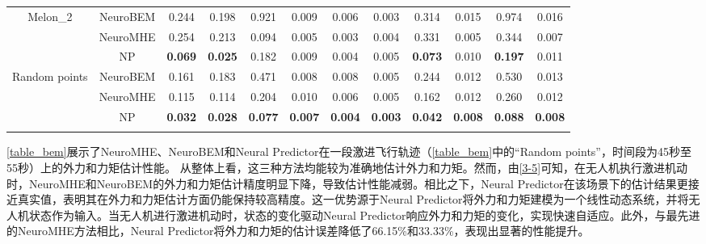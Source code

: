 \documentclass[lang=chs, degree=master, blindreview=false, winfonts=true]{yanputhesis}
\begin{document}
\begin{table}[h]
\begin{tabular}{c c c c c c c c c c c c}
	\hline
	\multirow{3}{*}{Melon\_2} & NeuroBEM & 0.244 & 0.198 & 0.921 & 0.009 & 0.006 & 0.003 & 0.314 & 0.015 & 0.974 & 0.016 \\
	& NeuroMHE & 0.254 & 0.213 & 0.094 & 0.005 & 0.003 & 0.004 & 0.331 & 0.005 & 0.344 & 0.007 \\
	& NP & \textbf{0.069} & \textbf{0.025} & 0.182 & 0.009 & 0.004 & 0.005 & \textbf{0.073} & 0.010 & \textbf{0.197} & 0.011 \\
	\hline
	\multirow{3}{*}{Random points} & NeuroBEM & 0.161 & 0.183 & 0.471 & 0.008 & 0.008 & 0.005 & 0.244 & 0.012 & 0.530 & 0.013 \\
	& NeuroMHE & 0.115 & 0.114 & 0.204 & 0.010 & 0.006 & 0.005 & 0.162 & 0.012 & 0.260 & 0.012 \\
	& NP & \textbf{0.032} & \textbf{0.028} & \textbf{0.077} & \textbf{0.007} & \textbf{0.004} & \textbf{0.003} & \textbf{0.042} & \textbf{0.008} & \textbf{0.088} & \textbf{0.008} \\
	\Xhline{1.pt}
\end{tabular}
\end{table}
\autoref{table_bem}展示了NeuroMHE、NeuroBEM和Neural Predictor在一段激进飞行轨迹（\autoref{table_bem}中的“Random points”，时间段为45秒至55秒）上的外力和力矩估计性能。
从整体上看，这三种方法均能较为准确地估计外力和力矩。然而，由\autoref{3-5}可知，在无人机执行激进机动时，NeuroMHE和NeuroBEM的外力和力矩估计精度明显下降，导致估计性能减弱。相比之下，Neural Predictor在该场景下的估计结果更接近真实值，表明其在外力和力矩估计方面仍能保持较高精度。这一优势源于Neural Predictor将外力和力矩建模为一个线性动态系统，并将无人机状态作为输入。当无人机进行激进机动时，状态的变化驱动Neural Predictor响应外力和力矩的变化，实现快速自适应。此外，与最先进的NeuroMHE方法相比，Neural Predictor将外力和力矩的估计误差降低了66.15\%和33.33\%，表现出显著的性能提升。
\end{document}
